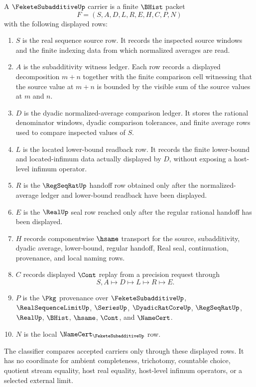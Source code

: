 \begin{definition}
\label{def:fekete-subadditive-carrier}
A $\FeketeSubadditiveUp$ carrier is a finite $\BHist$ packet
$$
F=(S,A,D,L,R,E,H,C,P,N)
$$
with the following displayed rows:
\begin{enumerate}
\item $S$ is the real sequence source row. It records the inspected source windows and the finite indexing data from which normalized averages are read.
\item $A$ is the subadditivity witness ledger. Each row records a displayed decomposition $m+n$ together with the finite comparison cell witnessing that the source value at $m+n$ is bounded by the visible sum of the source values at $m$ and $n$.
\item $D$ is the dyadic normalized-average comparison ledger. It stores the rational denominator windows, dyadic comparison tolerances, and finite average rows used to compare inspected values of $S$.
\item $L$ is the located lower-bound readback row. It records the finite lower-bound and located-infimum data actually displayed by $D$, without exposing a host-level infimum operator.
\item $R$ is the $\RegSeqRatUp$ handoff row obtained only after the normalized-average ledger and lower-bound readback have been displayed.
\item $E$ is the $\RealUp$ seal row reached only after the regular rational handoff has been displayed.
\item $H$ records componentwise $\hsame$ transport for the source, subadditivity, dyadic average, lower-bound, regular handoff, Real seal, continuation, provenance, and local naming rows.
\item $C$ records displayed $\Cont$ replay from a precision request through
$$
S,A\longmapsto D\longmapsto L\longmapsto R\longmapsto E .
$$
\item $P$ is the $\Pkg$ provenance over $\FeketeSubadditiveUp$, $\RealSequenceLimitUp$, $\SeriesUp$, $\DyadicRatCoreUp$, $\RegSeqRatUp$, $\RealUp$, $\BHist$, $\hsame$, $\Cont$, and $\NameCert$.
\item $N$ is the local $\NameCert_{\FeketeSubadditiveUp}$ row.
\end{enumerate}
The classifier compares accepted carriers only through these displayed rows. It has no coordinate for ambient completeness, trichotomy, countable choice, quotient stream equality, host real equality, host-level infimum operators, or a selected external limit.
\end{definition}

